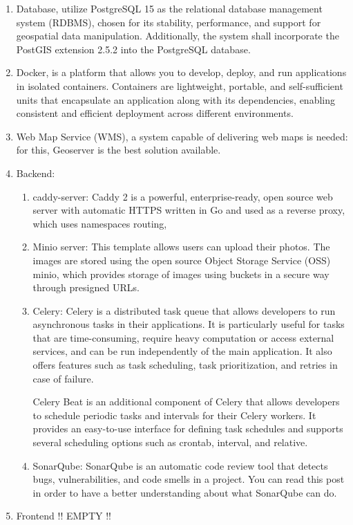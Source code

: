 \begin{enumerate}
    \item Database, utilize PostgreSQL 15 as the relational database management system (RDBMS), chosen for its stability, performance, and support for geospatial data manipulation. Additionally, the system shall incorporate the PostGIS extension 2.5.2 into the PostgreSQL database.

    \item Docker, is a platform that allows you to develop, deploy, and run applications in isolated containers. Containers are lightweight, portable, and self-sufficient units that encapsulate an application along with its dependencies, enabling consistent and efficient deployment across different environments.
    
    \item Web Map Service (WMS), a system capable of delivering web maps is needed: for this, Geoserver is the best solution available.
    
    \item Backend:
    \begin{enumerate}
        \item caddy-server: Caddy 2 is a powerful, enterprise-ready, open source web server with automatic HTTPS written in Go and used as a reverse proxy, which uses namespaces routing,
        
        \item Minio server: This template allows users can upload their photos. The images are stored using the open source Object Storage Service (OSS) minio, which provides storage of images using buckets in a secure way through presigned URLs.
    
        \item Celery: Celery is a distributed task queue that allows developers to run asynchronous tasks in their applications. It is particularly useful for tasks that are time-consuming, require heavy computation or access external services, and can be run independently of the main application. It also offers features such as task scheduling, task prioritization, and retries in case of failure.
        
        Celery Beat is an additional component of Celery that allows developers to schedule periodic tasks and intervals for their Celery workers. It provides an easy-to-use interface for defining task schedules and supports several scheduling options such as crontab, interval, and relative.
    
        \item SonarQube: SonarQube is an automatic code review tool that detects bugs, vulnerabilities, and code smells in a project. You can read this post in order to have a better understanding about what SonarQube can do.
    \end{enumerate}

    \item Frontend !! EMPTY !!
    

\end{enumerate}


